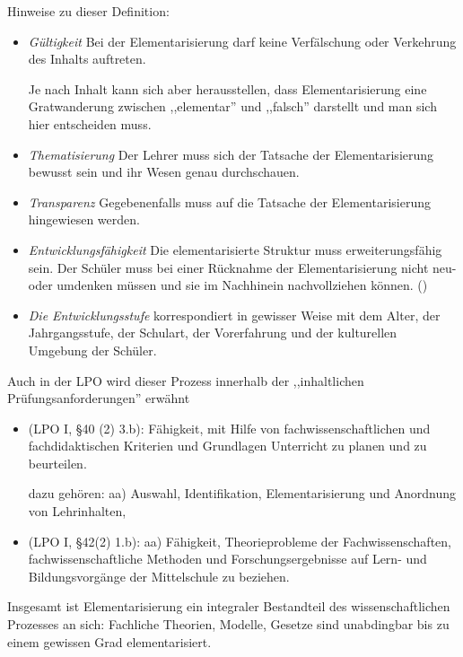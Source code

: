 \bip

Hinweise zu dieser Definition:
\begin{itemize}
\item { \it G\"{u}ltigkeit }
Bei der Elementarisierung darf keine Verf\"{a}lschung oder
Verkehrung des Inhalts auftreten.

Je nach Inhalt kann sich aber herausstellen, dass
Elementarisierung eine Gratwanderung zwischen ,,elementar''
und ,,falsch'' darstellt und man sich hier  entscheiden muss.
\item {\it Thematisierung }
Der Lehrer muss sich der Tatsache der Elementarisierung bewusst
sein und ihr Wesen genau durchschauen.
\item {\it Transparenz}
Gegebenenfalls muss auf die Tatsache der Elementarisierung
hingewiesen werden.
\item
{\it Entwicklungsf\"{a}higkeit}
Die elementarisierte Struktur muss erweiterungsf\"{a}hig sein.
Der Sch\"{u}\-ler muss bei einer R\"{u}cknahme der Elementarisierung
nicht neu- oder umdenken m\"{u}ssen und sie im Nachhinein
nachvollziehen k\"{o}nnen.
()
\item {\it Die Entwicklungsstufe} korrespondiert in gewisser
Weise mit dem Alter, der Jahrgangsstufe,
der Schulart, der Vorerfahrung und der kulturellen Umgebung
der Sch\"{u}ler.
\end{itemize}

Auch in der LPO wird dieser Prozess
innerhalb der ,,inhaltlichen Pr\"{u}fungsanforderungen'' erw\"{a}hnt
\begin{itemize}

\item  (LPO I, \S 40 (2) 3.b):
\nip
F\"{a}higkeit, mit Hilfe von fachwissenschaftlichen und
fachdidaktischen Kriterien und Grundlagen Unterricht zu planen und
zu beurteilen.

\bip
dazu geh\"{o}ren:
\mip
aa) Auswahl, Identifikation, Elementarisierung und Anordnung von Lehrinhalten,

\item
(LPO I, \S 42(2) 1.b):
\nip
aa) F\"{a}higkeit,
Theorieprobleme der Fachwissenschaften, fachwissenschaftliche
Methoden und Forschungsergebnisse auf Lern- und
Bildungsvorg\"{a}nge der Mittelschule zu beziehen.
\end{itemize}

Insgesamt ist Elementarisierung ein integraler Bestandteil des
wissenschaftlichen Prozesses an sich:
Fachliche Theorien, Modelle, Gesetze sind unabdingbar bis zu einem
gewissen Grad elementarisiert.

